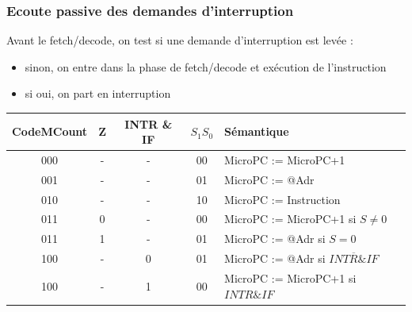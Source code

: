 \documentclass{beamer}
\begin{document}
\begin{frame}
\frametitle{Ecoute passive des demandes d'interruption}

Avant le fetch/decode, on test si une demande d'interruption est levée :
\begin{itemize}
\item sinon, on entre dans la phase de fetch/decode et exécution de l'instruction
\item si oui, on part en interruption
\end{itemize}

\begin{small}
\begin{tabular}{ccc|cl}
CodeMCount & Z & INTR \& IF & $S_1S_0$ & Sémantique\\
\hline
000 &  - & - & 00 & MicroPC := MicroPC+1\\
001 &  - & - & 01 & MicroPC := @Adr\\
010 &  - & - & 10 & MicroPC := Instruction\\
011 &  0 & - & 00 & MicroPC := MicroPC+1  si $S\neq 0$\\
011 &  1 & - & 01 & MicroPC := @Adr si $S=0$\\
100 &  - & 0 & 01 & MicroPC := @Adr si $\overline{INTR \& IF}$\\
100 &  - & 1 & 00 & MicroPC := MicroPC+1 si $INTR \& IF$
\end{tabular}
\end{small}

\end{frame}



\end{document}
